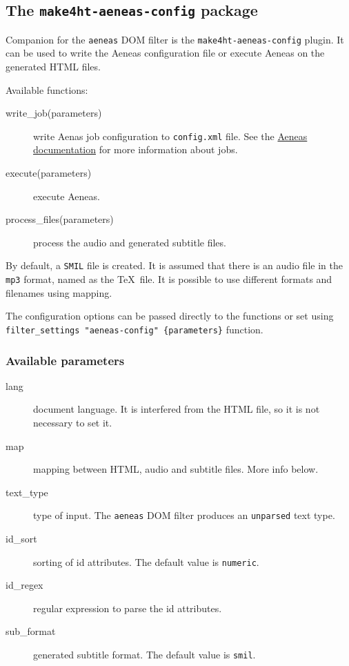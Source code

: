 \hypertarget{the-make4ht-aeneas-config-package}{%
\subsection{\texorpdfstring{The \texttt{make4ht-aeneas-config}
package}{The make4ht-aeneas-config package}}\label{the-make4ht-aeneas-config-package}}

Companion for the \texttt{aeneas} DOM filter is the
\texttt{make4ht-aeneas-config} plugin. It can be used to write the
Aeneas configuration file or execute Aeneas on the generated HTML files.

Available functions:

\begin{description}
\item[write\_job(parameters)]
write Aenas job configuration to \texttt{config.xml} file. See the
\href{https://www.readbeyond.it/aeneas/docs/clitutorial.html\#processing-jobs}{Aeneas
documentation} for more information about jobs.
\item[execute(parameters)]
execute Aeneas.
\item[process\_files(parameters)]
process the audio and generated subtitle files.
\end{description}

By default, a \texttt{SMIL} file is created. It is assumed that there is
an audio file in the \texttt{mp3} format, named as the \TeX~file. It is
possible to use different formats and filenames using mapping.

The configuration options can be passed directly to the functions or set
using \texttt{filter\_settings\ "aeneas-config"\ \{parameters\}}
function.

\hypertarget{available-parameters}{%
\subsubsection{Available parameters}\label{available-parameters}}

\begin{description}
\item[lang]
document language. It is interfered from the HTML file, so it is not
necessary to set it.
\item[map]
mapping between HTML, audio and subtitle files. More info below.
\item[text\_type]
type of input. The \texttt{aeneas} DOM filter produces an
\texttt{unparsed} text type.
\item[id\_sort]
sorting of id attributes. The default value is \texttt{numeric}.
\item[id\_regex]
regular expression to parse the id attributes.
\item[sub\_format]
generated subtitle format. The default value is \texttt{smil}.
\end{description}

